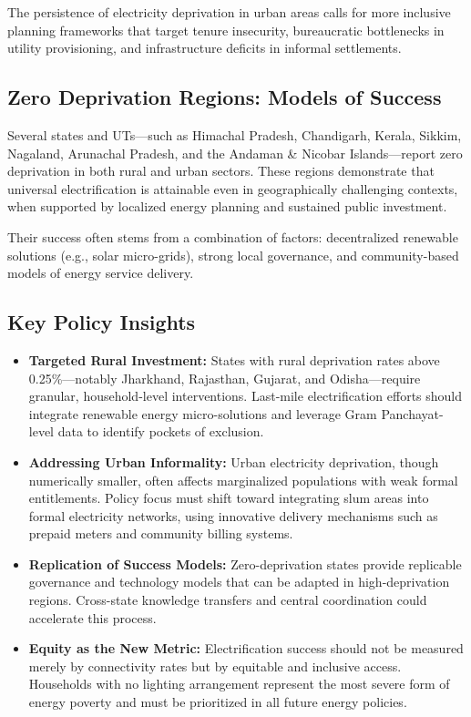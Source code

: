 \documentclass{article}
\begin{document}
The persistence of electricity deprivation in urban areas calls for more inclusive planning frameworks that target tenure insecurity, bureaucratic bottlenecks in utility provisioning, and infrastructure deficits in informal settlements.

\subsection*{Zero Deprivation Regions: Models of Success}

Several states and UTs---such as Himachal Pradesh, Chandigarh, Kerala, Sikkim, Nagaland, Arunachal Pradesh, and the Andaman \& Nicobar Islands---report zero deprivation in both rural and urban sectors. These regions demonstrate that universal electrification is attainable even in geographically challenging contexts, when supported by localized energy planning and sustained public investment.

Their success often stems from a combination of factors: decentralized renewable solutions (e.g., solar micro-grids), strong local governance, and community-based models of energy service delivery.

\subsection*{Key Policy Insights}

\begin{itemize}
	\item \textbf{Targeted Rural Investment:} States with rural deprivation rates above 0.25\%---notably Jharkhand, Rajasthan, Gujarat, and Odisha---require granular, household-level interventions. Last-mile electrification efforts should integrate renewable energy micro-solutions and leverage Gram Panchayat-level data to identify pockets of exclusion.
	
	\item \textbf{Addressing Urban Informality:} Urban electricity deprivation, though numerically smaller, often affects marginalized populations with weak formal entitlements. Policy focus must shift toward integrating slum areas into formal electricity networks, using innovative delivery mechanisms such as prepaid meters and community billing systems.
	
	\item \textbf{Replication of Success Models:} Zero-deprivation states provide replicable governance and technology models that can be adapted in high-deprivation regions. Cross-state knowledge transfers and central coordination could accelerate this process.
	
	\item \textbf{Equity as the New Metric:} Electrification success should not be measured merely by connectivity rates but by equitable and inclusive access. Households with no lighting arrangement represent the most severe form of energy poverty and must be prioritized in all future energy policies.
\end{itemize}
\end{document}
